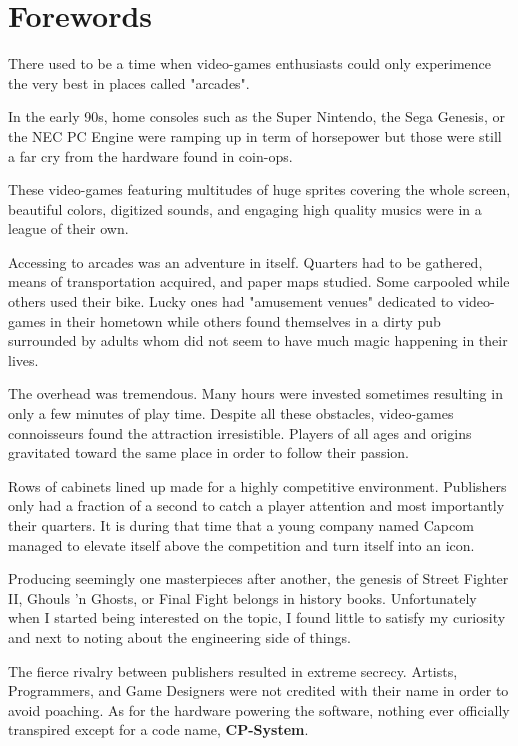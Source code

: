 \chapter*{Forewords}

There used to be a time when video-games enthusiasts could only experimence the very best in places called "arcades". 

In the early 90s, home consoles such as the Super Nintendo, the Sega Genesis, or the NEC PC Engine were ramping up in term of horsepower but those were still a far cry from the hardware found in coin-ops.

These video-games featuring multitudes of huge sprites covering the whole screen, beautiful colors, digitized sounds, and engaging high quality musics were in a league of their own.

Accessing to arcades was an adventure in itself. Quarters had to be gathered, means of transportation acquired, and paper maps studied. Some carpooled while others used their bike. Lucky ones had "amusement venues" dedicated to video-games in their hometown while others found themselves in a dirty pub surrounded by adults whom did not seem to have much magic happening in their lives. 

The overhead was tremendous. Many hours were invested sometimes resulting in only a few minutes of play time. Despite all these obstacles, video-games connoisseurs found the attraction irresistible. Players of all ages and origins gravitated toward the same place in order to follow their passion. 

Rows of cabinets lined up made for a highly competitive environment. Publishers only had a fraction of a second to catch a player attention and most importantly their quarters. It is during that time that a young company named Capcom  managed to elevate itself above the competition and turn itself into an icon.

Producing seemingly one masterpieces after another, the genesis of Street Fighter II, Ghouls 'n Ghosts, or Final Fight belongs in history books. Unfortunately when I started being interested on the topic, I found little to satisfy my curiosity and next to noting about the engineering side of things. 

The fierce rivalry between publishers resulted in extreme secrecy. Artists, Programmers, and Game Designers were not credited with their name in order to avoid poaching. As for the hardware powering the software, nothing ever officially transpired except for a code name, \textbf{CP-System}.

